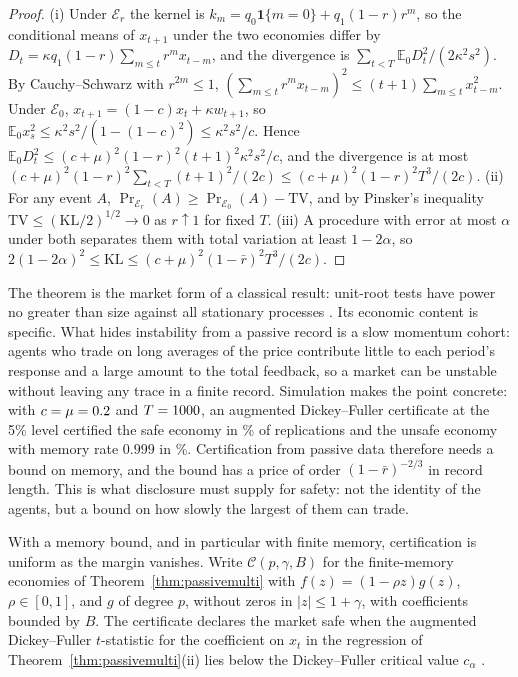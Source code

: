 \begin{proof}
(i) Under $\mathcal E_r$ the kernel is $k_m=q_0\mathbf 1\{m=0\}+q_1(1-r)r^m$, so the conditional means of $x_{t+1}$ under the two economies differ by $D_t=\kappa q_1(1-r)\sum_{m\le t}r^mx_{t-m}$, and the divergence is $\sum_{t<T}\mathbb E_0D_t^2/(2\kappa^2s^2)$. By Cauchy--Schwarz with $r^{2m}\le1$, $(\sum_{m\le t}r^mx_{t-m})^2\le(t+1)\sum_{m\le t}x_{t-m}^2$. Under $\mathcal E_0$, $x_{t+1}=(1-c)x_t+\kappa w_{t+1}$, so $\mathbb E_0x_s^2\le\kappa^2s^2/(1-(1-c)^2)\le\kappa^2s^2/c$. Hence $\mathbb E_0D_t^2\le(c+\mu)^2(1-r)^2(t+1)^2\kappa^2s^2/c$, and the divergence is at most $(c+\mu)^2(1-r)^2\sum_{t<T}(t+1)^2/(2c)\le(c+\mu)^2(1-r)^2T^3/(2c)$. (ii) For any event $A$, $\Pr_{\mathcal E_r}(A)\ge\Pr_{\mathcal E_0}(A)-\mathrm{TV}$, and by Pinsker's inequality $\mathrm{TV}\le(\mathrm{KL}/2)^{1/2}\to0$ as $r\uparrow1$ for fixed $T$. (iii) A procedure with error at most $\alpha$ under both separates them with total variation at least $1-2\alpha$, so $2(1-2\alpha)^2\le\mathrm{KL}\le(c+\mu)^2(1-\bar r)^2T^3/(2c)$.
\end{proof}

The theorem is the market form of a classical result: unit-root tests have power no greater than size against all stationary processes \citep{t:blough1992,t:faust1996,t:potscher2002}. Its economic content is specific. What hides instability from a passive record is a slow momentum cohort: agents who trade on long averages of the price contribute little to each period's response and a large amount to the total feedback, so a market can be unstable without leaving any trace in a finite record. Simulation makes the point concrete: with $c=\mu=0.2$ and $T=1000$, an augmented Dickey--Fuller certificate at the 5\% level certified the safe economy in \UniformSafeRate\% of \UniformReps{} replications and the unsafe economy with memory rate $0.999$ in \UniformUnsafeRate\%. Certification from passive data therefore needs a bound on memory, and the bound has a price of order $(1-\bar r)^{-2/3}$ in record length. This is what disclosure must supply for safety: not the identity of the agents, but a bound on how slowly the largest of them can trade.

With a memory bound, and in particular with finite memory, certification is uniform as the margin vanishes. Write $\mathcal C(p,\gamma,B)$ for the finite-memory economies of Theorem~\ref{thm:passivemulti} with $f(z)=(1-\rho z)g(z)$, $\rho\in[0,1]$, and $g$ of degree $p$, without zeros in $|z|\le1+\gamma$, with coefficients bounded by $B$. The certificate declares the market safe when the augmented Dickey--Fuller $t$-statistic for the coefficient on $x_t$ in the regression of Theorem~\ref{thm:passivemulti}(ii) lies below the Dickey--Fuller critical value $c_\alpha$ \citep{t:dickeyfuller1979}.

